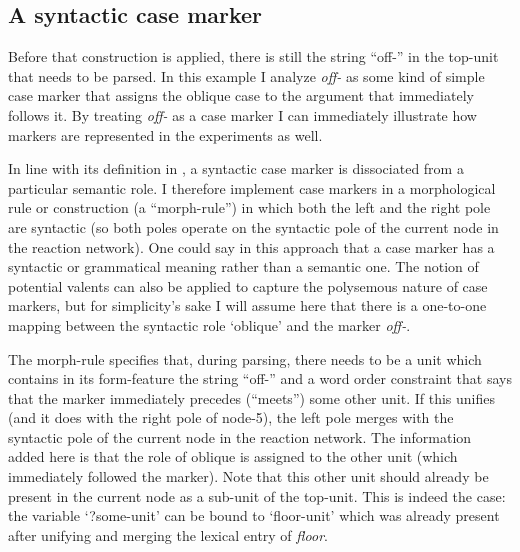 \subsection{A syntactic case marker}
\label{s:morph-rule}

Before that construction is applied, there is still the string ``off-'' in the top-unit that needs to be parsed. In this example I analyze {\em off-} as some kind of simple case marker that assigns the oblique case to the argument that immediately follows it. By treating {\em off-} as a case marker I can immediately illustrate how markers are represented in the experiments as well.

In line with its definition in , a syntactic case marker is dissociated from a particular semantic role. I therefore implement case markers in a morphological rule or construction (a ``morph-rule'') in which both the left and the right pole are syntactic (so both poles operate on the syntactic pole of the current node in the reaction network). One could say in this approach that a case marker has a syntactic or grammatical meaning rather than a semantic one. The notion of potential valents can also be applied to capture the polysemous nature of case markers, but for simplicity's sake I will assume here that there is a one-to-one mapping between the syntactic role `oblique' and the marker {\em off-}.

The morph-rule specifies that, during parsing, there needs to be a unit which contains in its form-feature the string ``off-'' and a word order constraint that says that the marker immediately precedes (``meets'') some other unit. If this unifies (and it does with the right pole of node-5), the left pole merges with the syntactic pole of the current node in the reaction network. The information added here is that the role of oblique is assigned to the other unit (which immediately followed the marker). Note that this other unit should already be present in the current node as a sub-unit of the top-unit. This is indeed the case: the variable `?some-unit' can be bound to `floor-unit' which was already present after unifying and merging the lexical entry of {\em floor}.

